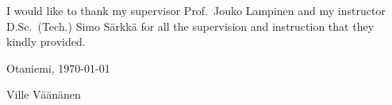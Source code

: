 I would like to thank my supervisor Prof.\  Jouko Lampinen and
my instructor D.Sc.\ (Tech.) Simo Särkkä for all the supervision
and instruction that they kindly provided.

\vspace{5cm}
Otaniemi, \today

\vspace{5mm}
{\hfill Ville Väänänen \hspace{1cm}}